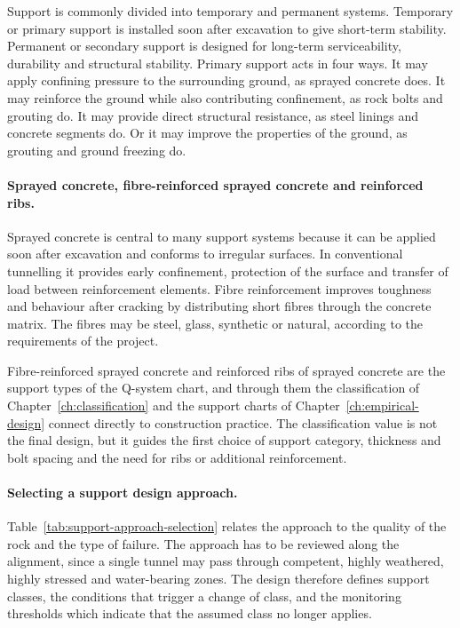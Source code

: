Support is commonly divided into temporary and permanent systems. Temporary
or primary support is installed soon after excavation to give short-term
stability. Permanent or secondary support is designed for long-term
serviceability, durability and structural stability. Primary support acts in
four ways. It may apply confining pressure to the surrounding ground, as
sprayed concrete does. It may reinforce the ground while also contributing
confinement, as rock bolts and grouting do. It may provide direct structural
resistance, as steel linings and concrete segments do. Or it may improve the
properties of the ground, as grouting and ground freezing do.

\paragraph{Sprayed concrete, fibre-reinforced sprayed concrete and reinforced ribs.}
\label{sec:shotcrete}
Sprayed concrete is central to many support systems because it can be applied soon
after excavation and conforms to irregular surfaces. In conventional
tunnelling it provides early confinement, protection of the surface and
transfer of load between reinforcement elements. Fibre reinforcement improves
toughness and behaviour after cracking by distributing short fibres through
the concrete matrix. The fibres may be steel, glass, synthetic or natural,
according to the requirements of the project.

Fibre-reinforced sprayed concrete and reinforced ribs of sprayed concrete are
the support types of the Q-system chart, and through them the classification
of Chapter~\ref{ch:classification} and the support charts of
Chapter~\ref{ch:empirical-design} connect directly to construction practice.
The classification value is not the final design, but it guides the first
choice of support category, thickness and bolt spacing and the need for ribs
or additional reinforcement.

\paragraph{Selecting a support design approach.}
\label{sec:support-approach-selection}
Table~\ref{tab:support-approach-selection} relates the approach to the quality of
the rock and the type of failure. The approach has to be reviewed along the
alignment, since a single tunnel may pass through competent, highly
weathered, highly stressed and water-bearing zones. The design therefore
defines support classes, the conditions that trigger a change of class, and
the monitoring thresholds which indicate that the assumed class no longer
applies.

